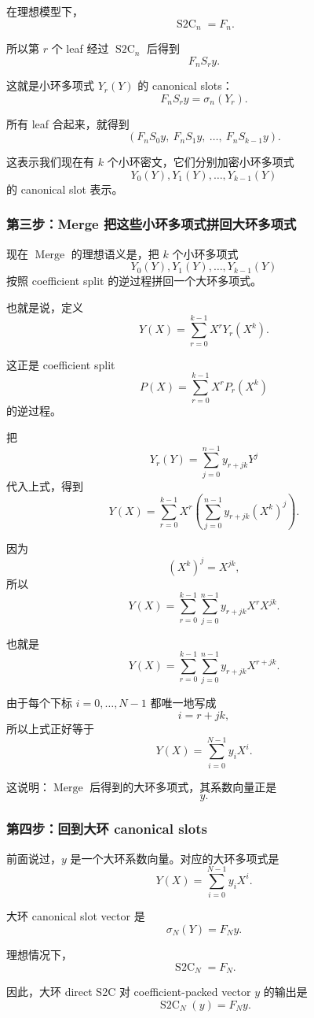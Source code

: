 \documentclass[UTF8,11pt]{ctexart}
\theoremstyle{definition}
\newcommand{\StwoC}{\operatorname{S2C}}
\newcommand{\Merge}{\operatorname{Merge}}
\begin{document}
在理想模型下，
\[
\StwoC_n=F_n.
\]

所以第 \(r\) 个 leaf 经过 \(\StwoC_n\) 后得到
\[
F_nS_ry.
\]

这就是小环多项式 \(Y_r(Y)\) 的 canonical slots：
\[
F_nS_ry
=
\sigma_n(Y_r).
\]

所有 leaf 合起来，就得到
\[
(F_nS_0y,\ F_nS_1y,\ \ldots,\ F_nS_{k-1}y).
\]

这表示我们现在有 \(k\) 个小环密文，它们分别加密小环多项式
\[
Y_0(Y),Y_1(Y),\ldots,Y_{k-1}(Y)
\]
的 canonical slot 表示。

\subsubsection*{第三步：Merge 把这些小环多项式拼回大环多项式}

现在 \(\Merge\) 的理想语义是，把 \(k\) 个小环多项式
\[
Y_0(Y),Y_1(Y),\ldots,Y_{k-1}(Y)
\]
按照 coefficient split 的逆过程拼回一个大环多项式。

也就是说，定义
\[
Y(X)
=
\sum_{r=0}^{k-1}X^rY_r(X^k).
\]

这正是 coefficient split
\[
P(X)=\sum_{r=0}^{k-1}X^rP_r(X^k)
\]
的逆过程。

把
\[
Y_r(Y)=\sum_{j=0}^{n-1}y_{r+jk}Y^j
\]
代入上式，得到
\[
Y(X)
=
\sum_{r=0}^{k-1}X^r
\left(
\sum_{j=0}^{n-1}y_{r+jk}(X^k)^j
\right).
\]

因为
\[
(X^k)^j=X^{jk},
\]
所以
\[
Y(X)
=
\sum_{r=0}^{k-1}
\sum_{j=0}^{n-1}
y_{r+jk}X^rX^{jk}.
\]

也就是
\[
Y(X)
=
\sum_{r=0}^{k-1}
\sum_{j=0}^{n-1}
y_{r+jk}X^{r+jk}.
\]

由于每个下标 \(i=0,\ldots,N-1\) 都唯一地写成
\[
i=r+jk,
\]
所以上式正好等于
\[
Y(X)=\sum_{i=0}^{N-1}y_iX^i.
\]

这说明：\(\Merge\) 后得到的大环多项式，其系数向量正是
\[
y.
\]

\subsubsection*{第四步：回到大环 canonical slots}

前面说过，\(y\) 是一个大环系数向量。对应的大环多项式是
\[
Y(X)=\sum_{i=0}^{N-1}y_iX^i.
\]

大环 canonical slot vector 是
\[
\sigma_N(Y)=F_Ny.
\]

理想情况下，
\[
\StwoC_N=F_N.
\]

因此，大环 direct S2C 对 coefficient-packed vector \(y\) 的输出是
\[
\StwoC_N(y)=F_Ny.
\]
\end{document}
